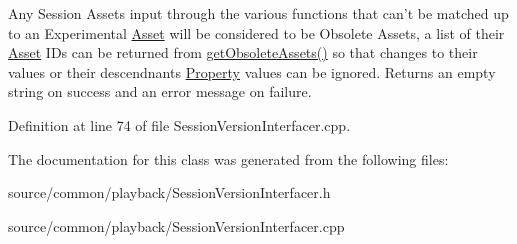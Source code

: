 Any Session Assets input through the various functions that can't be matched up to an Experimental \hyperlink{class_picto_1_1_asset}{Asset} will be considered to be Obsolete Assets, a list of their \hyperlink{class_picto_1_1_asset}{Asset} I\-Ds can be returned from \hyperlink{class_picto_1_1_session_version_interfacer_a226ca2af73c8ebbd2c475a38b791b50a}{get\-Obsolete\-Assets()} so that changes to their values or their descendnants \hyperlink{class_picto_1_1_property}{Property} values can be ignored. Returns an empty string on success and an error message on failure. 

Definition at line 74 of file Session\-Version\-Interfacer.\-cpp.



The documentation for this class was generated from the following files\-:\begin{DoxyCompactItemize}
\item 
source/common/playback/Session\-Version\-Interfacer.\-h\item 
source/common/playback/Session\-Version\-Interfacer.\-cpp\end{DoxyCompactItemize}
